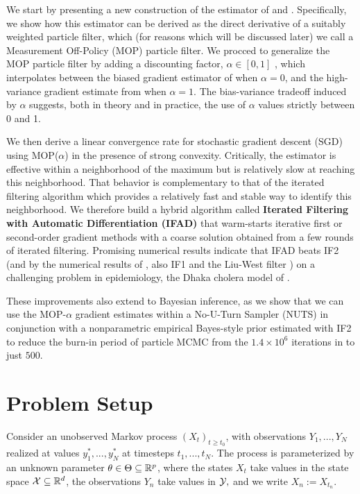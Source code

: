 \documentclass[9pt,twocolumn,twoside]{pnas-new}
\begin{document}
We start by presenting a new construction of the estimator of \cite{scibior21} and \cite{poyiadjis11}.
Specifically, we show how this estimator can be derived as the direct derivative of a suitably weighted particle filter, which (for reasons which will be discussed later) we call a Measurement Off-Policy (MOP) particle filter.
We procced to generalize the MOP particle filter by adding a discounting factor, $\alpha \in [0,1]$ , which interpolates between the  biased gradient estimator of \cite{naesseth18} when $\alpha=0$, and the high-variance gradient estimate from \cite{poyiadjis11, scibior21} when $\alpha=1$.
The bias-variance tradeoff induced by $\alpha$ suggests, both in theory and in practice, the use of $\alpha$ values strictly between 0 and 1.

We then derive a linear convergence rate for stochastic gradient descent (SGD) using MOP($\alpha$) in the  presence of strong convexity.
Critically, the estimator is effective within a neighborhood of the maximum but is relatively slow at reaching this neighborhood.
That behavior is complementary to that of the iterated filtering algorithm \cite{ionides06-pnas,ionides15} which provides a relatively fast and stable way to identify this neighborhood.
We therefore build a hybrid algorithm called \textbf{Iterated Filtering with Automatic Differentiation (IFAD)} that warm-starts iterative first or second-order gradient methods with a coarse solution obtained from a few rounds of iterated filtering. Promising numerical results indicate that IFAD beats IF2 (and by the numerical results of \cite{ionides15}, also IF1 and the Liu-West filter \cite{liuwest01}) on a challenging problem in epidemiology, the Dhaka cholera model of \cite{king08}.

These improvements also extend to Bayesian inference, as we show that we can use the MOP-$\alpha$ gradient estimates within a No-U-Turn Sampler (NUTS) \cite{homan14} in conjunction with a nonparametric empirical Bayes-style prior estimated with IF2 to reduce the burn-in period of particle MCMC \cite{andrieu10} from the $1.4 \times 10^6$ iterations in \cite{fasiolo16} to just $500$. 

\section{Problem Setup}

Consider an unobserved Markov process $(X_t)_{t \geq t_0}$, with observations $Y_1,...,Y_N$ realized at values $y_1^*,...,y_N^*$ at timesteps $t_1,..., t_N$. The process is parameterized by an unknown parameter $\theta \in \Theta \subseteq \mathbb{R}^p$, where the states $X_t$ take values in the state space ${\mathcal{X}} \subseteq \mathbb{R}^d$, the observations $Y_n$ take values in ${\mathcal{Y}},$ and we write $X_n := X_{t_n}$. 
\end{document}
